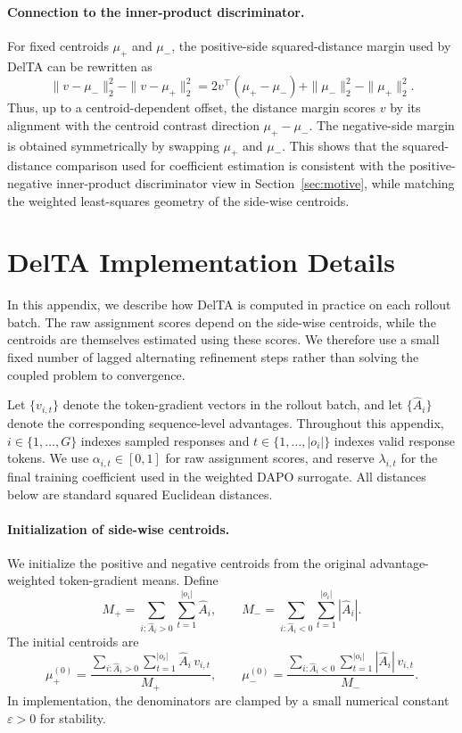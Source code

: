 \documentclass{llmxive}
\begin{document}
\paragraph{Connection to the inner-product discriminator.}
For fixed centroids \(\mu_+\) and \(\mu_-\), the positive-side squared-distance margin used by DelTA can be rewritten as
\[
\|v-\mu_-\|_2^2-\|v-\mu_+\|_2^2
=
2v^\top(\mu_+-\mu_-)
+
\|\mu_-\|_2^2-\|\mu_+\|_2^2 .
\]
Thus, up to a centroid-dependent offset, the distance margin scores \(v\) by its alignment with the centroid contrast direction \(\mu_+-\mu_-\). 
The negative-side margin is obtained symmetrically by swapping \(\mu_+\) and \(\mu_-\). 
This shows that the squared-distance comparison used for coefficient estimation is consistent with the positive-negative inner-product discriminator view in Section~\ref{sec:motive}, while matching the weighted least-squares geometry of the side-wise centroids.

\section{DelTA Implementation Details}
\label{app:DelTA-iteration}

In this appendix, we describe how DelTA is computed in practice on each rollout batch.
The raw assignment scores depend on the side-wise centroids, while the centroids are themselves estimated using these scores.
We therefore use a small fixed number of lagged alternating refinement steps rather than solving the coupled problem to convergence.

Let \(\{v_{i,t}\}\) denote the token-gradient vectors in the rollout batch, and let \(\{\hat A_i\}\) denote the corresponding sequence-level advantages.
Throughout this appendix, \(i\in\{1,\dots,G\}\) indexes sampled responses and \(t\in\{1,\dots,|o_i|\}\) indexes valid response tokens.
We use \(\alpha_{i,t}\in[0,1]\) for raw assignment scores, and reserve \(\lambda_{i,t}\) for the final training coefficient used in the weighted DAPO surrogate.
All distances below are standard squared Euclidean distances.

\paragraph{Initialization of side-wise centroids.}
We initialize the positive and negative centroids from the original advantage-weighted token-gradient means.
Define
\[
M_+
=
\sum_{i:\hat A_i>0}\sum_{t=1}^{|o_i|}
\hat A_i,
\qquad
M_-
=
\sum_{i:\hat A_i<0}\sum_{t=1}^{|o_i|}
|\hat A_i|.
\]
The initial centroids are
\[
\mu_+^{(0)}
=
\frac{
\sum_{i:\hat A_i>0}\sum_{t=1}^{|o_i|}
\hat A_i\,v_{i,t}
}{
M_+
},
\qquad
\mu_-^{(0)}
=
\frac{
\sum_{i:\hat A_i<0}\sum_{t=1}^{|o_i|}
|\hat A_i|\,v_{i,t}
}{
M_-
}.
\]
In implementation, the denominators are clamped by a small numerical constant \(\varepsilon>0\) for stability.
\end{document}
